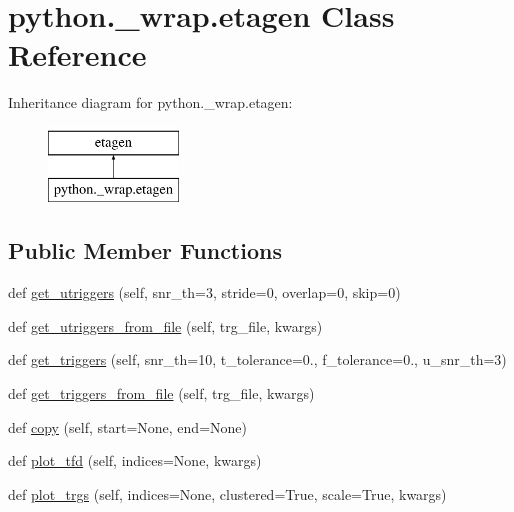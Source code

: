 \hypertarget{classpython_1_1__wrap_1_1etagen}{}\section{python.\+\_\+wrap.\+etagen Class Reference}
\label{classpython_1_1__wrap_1_1etagen}
Inheritance diagram for python.\+\_\+wrap.\+etagen\+:\begin{figure}[H]
\begin{center}
\leavevmode
\includegraphics[height=2.000000cm]{classpython_1_1__wrap_1_1etagen}
\end{center}
\end{figure}
\subsection*{Public Member Functions}
\begin{DoxyCompactItemize}
\item 
def \hyperlink{classpython_1_1__wrap_1_1etagen_acb093b2d8beddeb24f42f8d9ab02f8cf}{get\+\_\+utriggers} (self, snr\+\_\+th=3, stride=0, overlap=0, skip=0)
\item 
def \hyperlink{classpython_1_1__wrap_1_1etagen_ab05a1d15dbae756d7e8e3761e373b47d}{get\+\_\+utriggers\+\_\+from\+\_\+file} (self, trg\+\_\+file, kwargs)
\item 
def \hyperlink{classpython_1_1__wrap_1_1etagen_ac86f7be3f5230e5f0604d8fd5d547d83}{get\+\_\+triggers} (self, snr\+\_\+th=10, t\+\_\+tolerance=0., f\+\_\+tolerance=0., u\+\_\+snr\+\_\+th=3)
\item 
def \hyperlink{classpython_1_1__wrap_1_1etagen_ae7f503c80a1cfa91f20c5f726fab4a20}{get\+\_\+triggers\+\_\+from\+\_\+file} (self, trg\+\_\+file, kwargs)
\item 
def \hyperlink{classpython_1_1__wrap_1_1etagen_ac29b73902b108918ddf5b2b1ac4fd4eb}{copy} (self, start=None, end=None)
\item 
def \hyperlink{classpython_1_1__wrap_1_1etagen_abd7fa0ef1c2f5227d7a0a27797c54cbb}{plot\+\_\+tfd} (self, indices=None, kwargs)
\item 
def \hyperlink{classpython_1_1__wrap_1_1etagen_a632091efd6fe4f4fbbe5e8e40b045b16}{plot\+\_\+trgs} (self, indices=None, clustered=True, scale=True, kwargs)
\end{DoxyCompactItemize}
